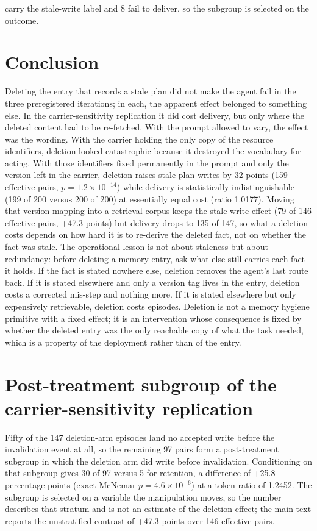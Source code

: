 \documentclass[11pt]{article}
\begin{document}
\begin{sloppypar}
carry the stale-write label and 8 fail to deliver, so the subgroup is selected on the outcome.

\section{Conclusion}

Deleting the entry that records a stale plan did not make the agent fail in the three preregistered iterations; in each, the apparent effect belonged to something else. In the carrier-sensitivity replication it did cost delivery, but only where the deleted content had to be re-fetched. With the prompt allowed to vary, the effect was the wording. With the carrier holding the only copy of the resource identifiers, deletion looked catastrophic because it destroyed the vocabulary for acting. With those identifiers fixed permanently in the prompt and only the version left in the carrier, deletion raises stale-plan writes by 32 points (159 effective pairs, $p=1.2\times10^{-14}$) while delivery is statistically indistinguishable (199 of 200 versus 200 of 200) at essentially equal cost (ratio 1.0177). Moving that version mapping into a retrieval corpus keeps the stale-write effect (79 of 146 effective pairs, +47.3 points) but delivery drops to 135 of 147, so what a deletion costs depends on how hard it is to re-derive the deleted fact, not on whether the fact was stale. The operational lesson is not about staleness but about redundancy: before deleting a memory entry, ask what else still carries each fact it holds. If the fact is stated nowhere else, deletion removes the agent's last route back. If it is stated elsewhere and only a version tag lives in the entry, deletion costs a corrected mis-step and nothing more. If it is stated elsewhere but only expensively retrievable, deletion costs episodes. Deletion is not a memory hygiene primitive with a fixed effect; it is an intervention whose consequence is fixed by whether the deleted entry was the only reachable copy of what the task needed, which is a property of the deployment rather than of the entry.

\appendix

\section{Post-treatment subgroup of the carrier-sensitivity replication}
\label{app:sa-strat}

Fifty of the 147 deletion-arm episodes land no accepted write before the invalidation event at all, so the remaining 97 pairs form a post-treatment subgroup in which the deletion arm did write before invalidation. Conditioning on that subgroup gives 30 of 97 versus 5 for retention, a difference of +25.8 percentage points (exact McNemar $p=4.6\times10^{-6}$) at a token ratio of 1.2452. The subgroup is selected on a variable the manipulation moves, so the number describes that stratum and is not an estimate of the deletion effect; the main text reports the unstratified contrast of +47.3 points over 146 effective pairs.


\end{sloppypar}
\end{document}
